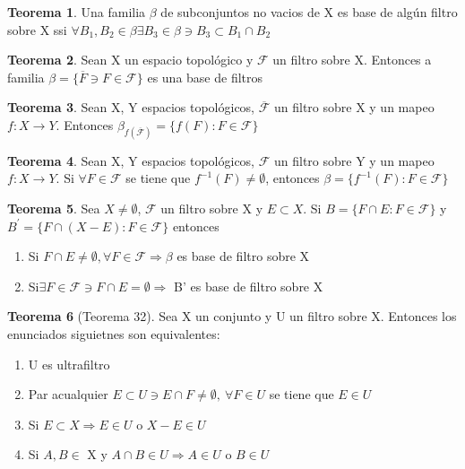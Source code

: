 \documentclass{article}
\theoremstyle{definition}
\newtheorem{theorem}{Teorema}[section]
\begin{document}
\begin{theorem}
	Una familia $\beta$ de subconjuntos no vacios de X es base de algún filtro sobre X ssi $\forall B_1,B_2 \in \beta\exists B_3\in\beta\ni B_3\subset B_1\cap B_2$
\end{theorem}
\begin{theorem}
	Sean X un espacio topológico y $\mathcal{F}$ un filtro sobre X. Entonces a familia $\beta=\{\overline{F}\ni F\in \mathcal{F}\}$ es una base de filtros
\end{theorem}
\begin{theorem}
	Sean X, Y espacios topológicos, $\overline{\mathcal{F}}$ un filtro sobre X y un mapeo $f:X\to Y$. Entonces $\beta_{f(\overline{\mathcal{F}})}=\{f(F):F\in \mathcal{F}\}$
\end{theorem}
\begin{theorem}
	Sean X, Y espacios topológicos, $\mathcal{F}$ un filtro sobre Y y un mapeo $f:X\to Y$. Si $\forall F\in \mathcal{F}$ se tiene que $f^{-1}(F)\neq\emptyset$, entonces $\beta=\{f^{-1}(F):F\in \mathcal{F}\}$
\end{theorem}
\begin{theorem}
	Sea $X\neq\emptyset$, $\mathcal{F}$ un filtro sobre X y $E\subset X$. Si $B=\{F\cap E: F\in \mathcal{F}\}$ 
y $B^{'}=\{F\cap (X-E): F\in \mathcal{F}\}$ entonces 
	\begin{enumerate}
		\item Si $F\cap E\neq \emptyset, \forall F\in \mathcal{F}\Rightarrow \beta$ es base de filtro sobre X
		\item Si$\exists F\in \mathcal{F}\ni F\cap E = \emptyset \Rightarrow$ B' es base de filtro sobre X 
	\end{enumerate}
\end{theorem}
\begin{theorem}[Teorema 32]
	Sea X un conjunto y U un filtro sobre X. Entonces los enunciados siguietnes son equivalentes:
	\begin{enumerate}
		\item U es ultrafiltro
		\item Par acualquier $E\subset U\ni E\cap F\neq \emptyset,\ \forall F\in U$ se tiene que $E\in U$
		\item Si $E\subset X\Rightarrow E\in U$ o $X-E\in U$
		\item Si $A, B\in$ X y $ A\cap B\in U\Rightarrow A\in U$ o $ B\in U$
	\end{enumerate}
\end{theorem}
\end{document}

